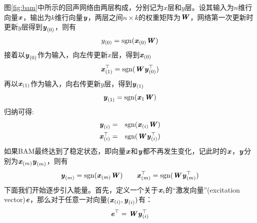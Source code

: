 图\ref{fig:bam}中所示的回声网络由两层构成，分别记为$x$层和$y$层。设其输入为$n$维行向量$\Vx$，输出为$k$维行向量$\Vy$，两层之间$n \times k$的权重矩阵为$\MW$，网络第一次更新时更新$y$层得到$\Vy_{(0)}$，则有
\begin{eqnarray}
y_{(0)} = \mathop{\rm sgn}(\Vx_{(0)}\MW) \nonumber
\end{eqnarray}
接着以$\Vy_{(0)}$作为输入，向左传更新$x$层，得到$\Vx_{(0)}$
\begin{eqnarray}
\Vx_{(1)}^\top = \mathop{\rm sgn}(\MW\Vy_{(0)}^\top)\nonumber
\end{eqnarray}
再以$\Vx_{(1)}$作为输入，向右传更新$y$层，得到$\Vy_{(1)}$
\begin{eqnarray}
\Vy_{(1)} = \mathop{\rm sgn}(\Vx_{1}\MW)\nonumber
\end{eqnarray}
归纳可得:
\begin{eqnarray}
\Vy_{(i)} &=& \mathop{\rm sgn}(\Vx_{(i)}\MW)\nonumber\\
\Vx_{(i)}^\top &=& \mathop{\rm sgn}(\MW\Vy_{(i)}^\top)\nonumber
\end{eqnarray}
如果BAM最终达到了稳定状态，即向量$\Vx$和$\Vy$都不再发生变化，记此时的$\Vx$，$\Vy$分别为$\Vx_{(m)} \Vy_{(m)}$，则有
\begin{eqnarray}
\Vy_{(m)} = \mathop{\rm sgn}(\Vx_{(m)}\MW) \quad \quad \Vx_{(m)}^\top = \mathop{\rm sgn}(\MW\Vy_{(m)}^\top)\nonumber
\end{eqnarray}
下面我们开始逐步引入能量。首先，定义一个关于$\Vx_{i}$的“激发向量”(excitation vector)$\Ve$，那么对于任意一对向量$(\Vx_{(i)},\Vy_{(i)})$有：
\begin{eqnarray}
\Ve^\top = \MW\Vy_{(i)}^\top\nonumber
\end{eqnarray}

